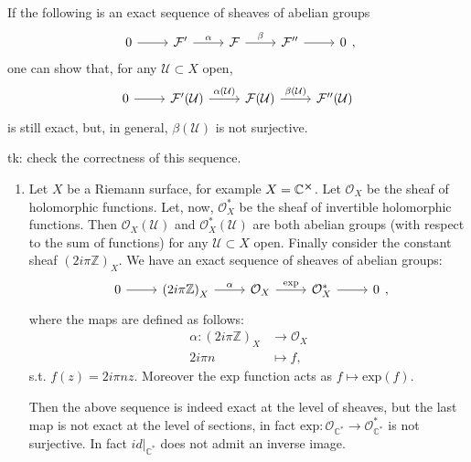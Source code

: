 \documentclass[../Main]{subfiles}
\begin{document}
\begin{rem}[]
	If the following is an exact sequence of sheaves of abelian groups
	\begin{equation}
	\begin{tikzcd}
		0 \arrow[r, "", rightarrow] &
		\mathcal{F}' \arrow[r, "\alpha", rightarrow] &
		\mathcal{F} \arrow[r, "\beta", rightarrow] &
		\mathcal{F}'' \arrow[r, "", rightarrow] &
		0
	\end{tikzcd}
	,\end{equation} 
	one can show that, for any $\mathcal{U} \subset X$ open,
	\begin{equation}
	\begin{tikzcd}
		0 \arrow[r, "", rightarrow] &
		\mathcal{F}'(\mathcal{U}) \arrow[r, "\alpha(\mathcal{U})", rightarrow] &
		\mathcal{F}(\mathcal{U}) \arrow[r, "\beta(\mathcal{U})", rightarrow] &
		\mathcal{F}''(\mathcal{U})
	\end{tikzcd}
	\end{equation} 
	is still exact, but, in general, $\beta(\mathcal{U})$ is not surjective.
\end{rem}

\begin{ex}[]
	tk: check the correctness of this sequence.
	\begin{enumerate}
		\item Let $X$ be a Riemann surface, for example $X = \mathbb{C}^{\cross}$.
			Let $\mathcal{O}_X$ be the sheaf of holomorphic functions.
			Let, now, $\mathcal{O}^*_X$ be the sheaf of invertible holomorphic functions.
			Then $\mathcal{O}_X(\mathcal{U})$ and $\mathcal{O}^*_X(\mathcal{U})$
			are both abelian groups (with respect to the sum of functions) 
			for any $\mathcal{U} \subset X$ open.
			Finally consider the constant sheaf $\left( 2i\pi \mathbb{Z} \right)_X$.
			We have an exact sequence of sheaves of abelian groups:
			\begin{equation}
			\begin{tikzcd}
				0 \arrow[r, "", rightarrow] &
				\left( 2i\pi \mathbb{Z} \right)_X \arrow[r, "\alpha", rightarrow] &
				\mathcal{O}_X \arrow[r, "\mathrm{exp}", rightarrow] &
				\mathcal{O}^*_X \arrow[r, "", rightarrow] &
				0
			\end{tikzcd}
			,\end{equation} 
			where the maps are defined as follows:
			\begin{align}
				\alpha: \left( 2i\pi \mathbb{Z} \right)_X &\longrightarrow 
				\mathcal{O}_X\\
				2i\pi n &\longmapsto f \nonumber
			,\end{align} 
			s.t. $f(z) = 2i\pi n z$.
			Moreover the $\mathrm{exp}$ function acts as $f \mapsto \mathrm{exp}(f)$.

			Then the above sequence is indeed exact at the level of sheaves,
			but the last map is not exact at the level of sections, in fact
			$\mathrm{exp}\colon \mathcal{O}_{\mathbb{C}^*} \to \mathcal{O}^*_{\mathbb{C}^*}$
			is not surjective.
			In fact $\left.id\right|_{\mathbb{C}^*}$ does not admit an inverse image.
	\end{enumerate}
\end{ex}
\end{document}

